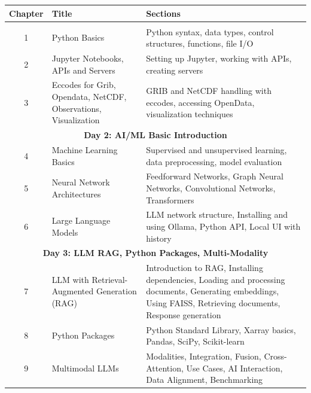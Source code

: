 % 
\begin{longtable}{|c|p{5cm}|p{8cm}|}
\hline
\rowcolor{headerblue} \textbf{Chapter} & \textbf{Title} & \textbf{Sections} \\
\hline
\endhead
\hline
\endfoot

\multicolumn{3}{|c|}{\cellcolor{headerblue} \textbf{Day 1: Python as Workhorse}} \\ \hline
\rowcolor{lightblue} 1  & Python Basics & Python syntax, data types, control structures, functions, file I/O \\ \hline
2  & Jupyter Notebooks, APIs and Servers & Setting up Jupyter, working with APIs, creating servers \\ \hline
\rowcolor{lightblue} 3  & Eccodes for Grib, Opendata, NetCDF, Observations, Visualization & GRIB and NetCDF handling with eccodes, accessing OpenData, visualization techniques \\ \hline

\multicolumn{3}{|c|}{\cellcolor{headerblue} \textbf{Day 2: AI/ML Basic Introduction}} \\ \hline
\rowcolor{lightblue} 4  & Machine Learning Basics & Supervised and unsupervised learning, data preprocessing, model evaluation \\ \hline
5  & Neural Network Architectures & Feedforward Networks, Graph Neural Networks, Convolutional Networks, Transformers \\ \hline
\rowcolor{lightblue} 6  & Large Language Models & LLM network structure, Installing and using Ollama, Python API, Local UI with history \\ \hline

\multicolumn{3}{|c|}{\cellcolor{headerblue} \textbf{Day 3: LLM RAG, Python Packages, Multi-Modality}} \\ \hline
\rowcolor{lightblue} 7  & LLM with Retrieval-Augmented Generation (RAG) & Introduction to RAG, Installing dependencies, Loading and processing documents, Generating embeddings, Using FAISS, Retrieving documents, Response generation \\ \hline
8  & Python Packages & Python Standard Library, Xarray basics, Pandas, SciPy, Scikit-learn \\ \hline
\rowcolor{lightblue} 9  & Multimodal LLMs & Modalities, Integration, Fusion, Cross-Attention, Use Cases, AI Interaction, Data Alignment, Benchmarking \\ \hline


\end{longtable}
